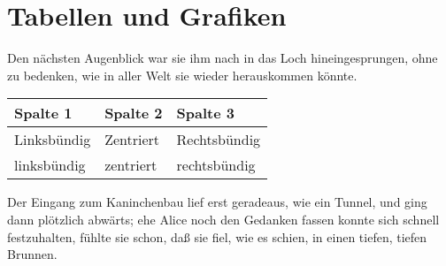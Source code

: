 \documentclass[DIV=calc,10pt,parskip=half,twocolumn]{scrartcl}
\begin{document}
\section{Tabellen und Grafiken}

Den nächsten Augenblick war sie ihm nach in das Loch hineingesprungen, ohne zu
bedenken, wie in aller Welt sie wieder herauskommen könnte.

\begin{center}
\begin{tabular}{lll}
  \toprule
   Spalte 1 &  Spalte 2 & Spalte 3\\
   \midrule
   Linksbündig & Zentriert & Rechtsbündig\\
   linksbündig & zentriert & rechtsbündig\\
   \bottomrule
\end{tabular}
\end{center}

Der Eingang zum Kaninchenbau lief erst geradeaus, wie ein Tunnel, und ging dann
plötzlich abwärts; ehe Alice noch den Gedanken fassen konnte sich schnell
festzuhalten, fühlte sie schon, daß sie fiel, wie es schien, in einen tiefen,
tiefen Brunnen.





\end{document}
